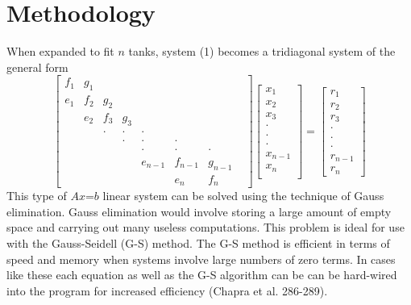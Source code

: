 \documentclass[titlepage,12pt]{article}
\begin{document}
\section{Methodology}
When expanded to fit $n$ tanks, system (1) becomes a tridiagonal
system of the general form
\begin{displaymath}
\left[
\begin{array}{cccccccc}
f_1 & g_1 & & & & & & \\
e_1 & f_2 & g_2 & & & & & \\
 & e_2 & f_3 & g_3 & & & & \\
 & & \cdot & \cdot & \cdot & & & \\
 & & & \cdot & \cdot & \cdot & & \\
 & & & & \cdot & \cdot & \cdot & \\
 & & & & e_{n-1} & f_{n-1} & g_{n-1}\\
 & & & & & e_n & f_n
\end{array}
\right] \left[
\begin{array}{c}
x_1\\
x_2\\
x_3\\
\cdot\\
\cdot\\
\cdot\\
x_{n-1}\\
x_n\\
\end{array}
\right] = \left[
\begin{array}{c}
r_1\\
r_2\\
r_3\\
\cdot\\
\cdot\\
\cdot\\
r_{n-1}\\
r_n
\end{array}
\right]
\end{displaymath}
This type of $A$\underline{$x$}=\underline{$b$} linear system can be
solved using the technique of Gauss elimination. Gauss elimination
would involve storing a large amount of empty space and carrying out
many useless computations. This problem is ideal for use with the
Gauss-Seidell (G-S) method. The G-S method is efficient in terms of
speed and memory when systems involve large numbers of zero terms.
In cases like these each equation as well as the G-S algorithm can
be can be hard-wired into the program for increased efficiency
(Chapra et al. 286-289).
\end{document}
